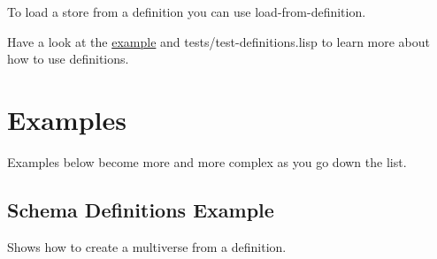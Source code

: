\documentclass[11pt]{article}
\begin{document}
To load a store from a definition you can use load-from-definition.

Have a look at the \href{definitions-example.org}{example} and tests/test-definitions.lisp to learn
more about how to use definitions.

\section{Examples}
\label{sec:org42b61b0}

Examples below become more and more complex as you go down the list.

\subsection{Schema Definitions Example}
\label{sec:orgf69dc69}

Shows how to create a multiverse from a definition.
\end{document}
